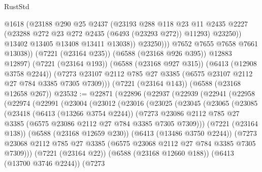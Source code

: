 \begin{lexlean}{RustStd}
\begin{coremodule}
                      @1618
                      (@23188
                        @290
                        @25
                        @2437
                        (@23193
                          @288
                          @118
                          @23
                          @11
                          @2435
                          @2227
                          (@23288 @272 @23 @272 @2435 (@6493 (@23293 @272)) @11293)
                          @23250))
                      @13402
                      @13405
                      @13408
                      @13411
                      @13038))
                  @23250)))
            @7652
            @7655
            @7658
            @7661
            @13038))
        (@7221 (@23164 @235))
        (@6588 (@23168 @926 @395))
        @12883
        @12897)
      (@7221 (@23164 @193))
      (@6588 (@23168 @927 @315))
      (@6413 (@12908 @3758 @2244))
      (@7273 @23107 @2112 @785 @27 @3385 (@6575 @23107 @2112 @27 @784 @3385 @7305 @7309)))
    (@7221 (@23164 @143))
    (@6588 (@23168 @12658 @267))
@23532 := @22871
    (@22896
      (@22937
        (@22939
          (@22941
            (@22958
              (@22974
                (@22991
                  (@23004
                    (@23012
                      (@23016
                        (@23025
                          (@23045
                            (@23065
                              (@23085
                                (@23418
                                  (@6413 (@13266 @3754 @2244))
                                  (@7273
                                    @23086
                                    @2112
                                    @785
                                    @27
                                    @3385
                                    (@6575 @23086 @2112 @27 @784 @3385 @7305 @7309)))
                                (@7221 (@23164 @138))
                                (@6588 (@23168 @12659 @230))
                                (@6413 (@13486 @3750 @2244))
                                (@7273
                                  @23068
                                  @2112
                                  @785
                                  @27
                                  @3385
                                  (@6575 @23068 @2112 @27 @784 @3385 @7305 @7309)))
                              (@7221 (@23164 @22))
                              (@6588 (@23168 @12660 @188))
                              (@6413 (@13700 @3746 @2244))
                              (@7273

\end{coremodule}
\end{lexlean}
